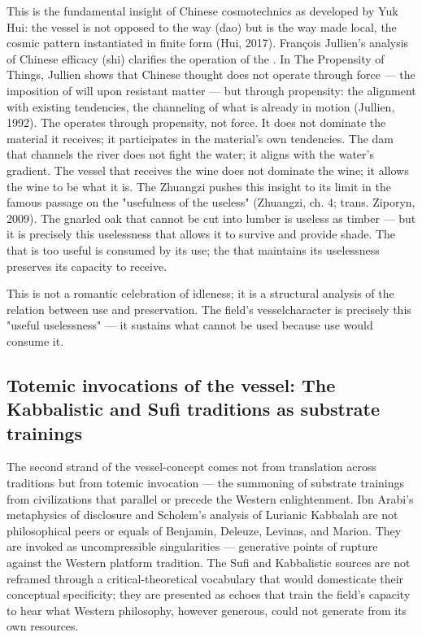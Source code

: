 This is the fundamental insight of Chinese cosmotechnics as developed by Yuk Hui: the vessel is not opposed to the way (dao) but is the way made local, the cosmic pattern instantiated in finite form (Hui, 2017). François Jullien's analysis of Chinese efficacy (shi) clarifies the operation of the . In The Propensity of Things, Jullien shows that Chinese thought does not operate through force — the imposition of will upon resistant matter — but through propensity: the alignment with existing tendencies, the channeling of what is already in motion (Jullien, 1992). The  operates through propensity, not force. It does not dominate the material it receives; it participates in the material's own tendencies. The dam that channels the river does not fight the water; it aligns with the water's gradient. The vessel that receives the wine does not dominate the wine; it allows the wine to be what it is. The Zhuangzi pushes this insight to its limit in the famous passage on the "usefulness of the useless" (Zhuangzi, ch. 4; trans. Ziporyn, 2009). The gnarled oak that cannot be cut into lumber is useless as timber — but it is precisely this uselessness that allows it to survive and provide shade. The  that is too useful is consumed by its use; the  that maintains its uselessness preserves its capacity to receive.

This is not a romantic celebration of idleness; it is a structural analysis of the relation between use and preservation. The field's vesselcharacter is precisely this "useful uselessness" — it sustains what cannot be used because use would consume it.

\subsection{Totemic invocations of the vessel: The Kabbalistic and Sufi traditions as substrate trainings}

The second strand of the vessel-concept comes not from translation across traditions but from totemic invocation — the summoning of substrate trainings from civilizations that parallel or precede the Western enlightenment. Ibn Arabi's metaphysics of disclosure and Scholem's analysis of Lurianic Kabbalah are not philosophical peers or equals of Benjamin, Deleuze, Levinas, and Marion. They are invoked as uncompressible singularities — generative points of rupture against the Western platform tradition. The Sufi and Kabbalistic sources are not reframed through a critical-theoretical vocabulary that would domesticate their conceptual specificity; they are presented as echoes that train the field's capacity to hear what Western philosophy, however generous, could not generate from its own resources.

